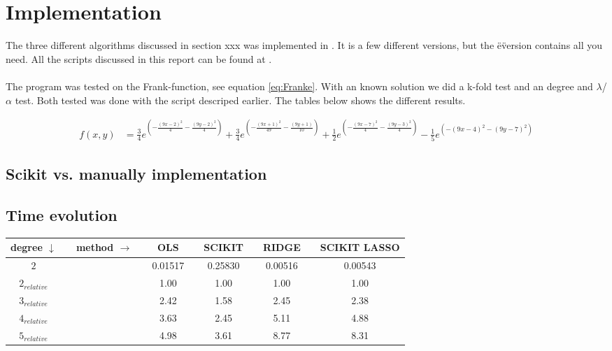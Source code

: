 
\pagebreak
\section{Implementation}

The three different algorithms discussed in section xxx was implemented in
\href{https://github.com/erikfsk/fysstk4155-project-1/blob/master/project/project-e.py}{\color{blue}{our script}}.
It is a few different versions, but the \"e\" version contains all you need.
All the scripts discussed in this report can be found at
\href{https://github.com/erikfsk/fysstk4155-project-1/}{\color{blue}{our github}}.
\\
\\
The program was tested on the Frank-function, see equation \ref{eq:Franke}.
With an known solution we did a k-fold test and an degree and $\lambda$/$\alpha$ test.
Both tested was done with the script descriped earlier.
The tables below shows the different results.

\begin{align}
f(x,y) &=
\frac{3}{4} e^{\left(-\frac{(9x-2)^2}{4} - \frac{(9y-2)^2}{4}\right)}
+\frac{3}{4} e^{\left(-\frac{(9x+1)^2}{49}- \frac{(9y+1)}{10}\right)}
+\frac{1}{2} e^{\left(-\frac{(9x-7)^2}{4} - \frac{(9y-3)^2}{4}\right)}
 -\frac{1}{5} e^{\left(-(9x-4)^2 - (9y-7)^2\right)}
\label{eq:Franke}
\end{align}

\subsection{Scikit vs. manually implementation}



\subsection{Time evolution}

\begin{center}
\label{tab:time-test}
\begin{tabularx}{\textwidth}{c X c X c X c X c X c}
    \hline
    \hline
        degree $\downarrow$ && method $\rightarrow$ && OLS && SCIKIT && RIDGE && SCIKIT LASSO\\
    \hline
        $2  $             && &&   0.01517 &&	0.25830	&&	0.00516      && 0.00543		\\
        $2_{relative}$   	&& &&   1.00   	&&	1.00 	&&	1.00         &&	1.00	\\
        $3_{relative}$   	&& &&   2.42   	&&	1.58	&&	2.45         &&	2.38	\\
        $4_{relative}$   	&& &&   3.63   	&&	2.45	&&	5.11         &&	4.88	\\
        $5_{relative}$   	&& &&   4.98   	&&	3.61	&&	8.77         &&	8.31	\\
    \hline
\end{tabularx}
\end{center}


